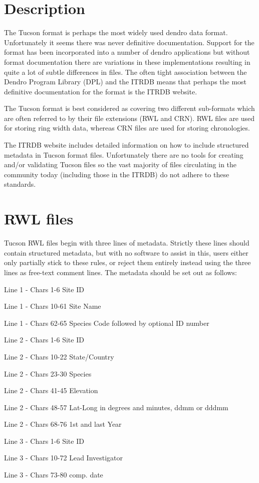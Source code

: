 \documentclass[10pt, headsepline,DIV14,BCOR0.5cm]{scrreprt}
\begin{document}
\section{Description}
The Tucson format is perhaps the most widely used dendro data format. Unfortunately it seems there was never definitive documentation. Support for the format has been incorporated into a number of dendro applications but without format documentation there are variations in these implementations resulting in quite a lot of subtle differences in files. The often tight association between the Dendro Program Library (DPL) and the ITRDB means that perhaps the most definitive documentation for the format is the ITRDB website.

The Tucson format is best considered as covering two different sub-formats which are often referred to by their file extensions (RWL and CRN). RWL files are used for storing ring width data, whereas CRN files are used for storing chronologies.

The ITRDB website includes detailed information on how to include structured metadata in Tucson format files. Unfortunately there are no tools for creating and/or validating Tucson files so the vast majority of files circulating in the community today (including those in the ITRDB) do not adhere to these standards. 

\section{RWL files}
Tucson RWL files begin with three lines of metadata. Strictly these lines should contain structured metadata, but with no software to assist in this, users either only partially stick to these rules, or reject them entirely instead using the three lines as free-text comment lines. The metadata should be set out as follows:

\begin{itemize*}
    \item  Line 1 - Chars 1-6 Site ID
    \item  Line 1 - Chars 10-61 Site Name
    \item  Line 1 - Chars 62-65 Species Code followed by optional ID number
    \item  Line 2 - Chars 1-6 Site ID
    \item  Line 2 - Chars 10-22 State/Country
    \item  Line 2 - Chars 23-30 Species
    \item  Line 2 - Chars 41-45 Elevation
    \item  Line 2 - Chars 48-57 Lat-Long in degrees and minutes, ddmm or dddmm
    \item  Line 2 - Chars 68-76 1st and last Year
    \item  Line 3 - Chars 1-6 Site ID
    \item  Line 3 - Chars 10-72 Lead Investigator
    \item  Line 3 - Chars 73-80 comp. date 
\end{itemize*}
\end{document}
